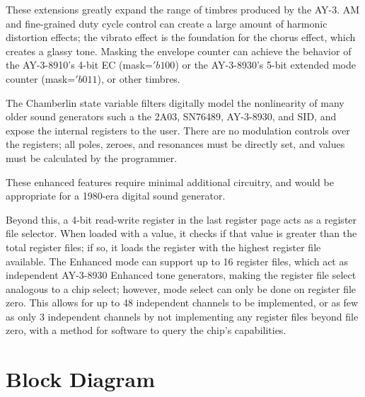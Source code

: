 These extensions greatly expand the range of timbres produced by the AY-3.  AM and fine-grained duty cycle control can create a large amount of harmonic distortion effects; the vibrato effect is the foundation for the chorus effect, which creates a glassy tone.  Masking the envelope counter can achieve the behavior of the AY-3-8910's 4-bit EC (mask=$'b100$) or the AY-3-8930's 5-bit extended mode counter (mask=$'b011$), or other timbres.

The Chamberlin state variable filters digitally model the nonlinearity of many older sound generators such a the 2A03, SN76489, AY-3-8930, and SID, and expose the internal registers to the user.  There are no modulation controls over the registers; all poles, zeroes, and resonances must be directly set, and values must be calculated by the programmer.

These enhanced features require minimal additional circuitry, and would be appropriate for a 1980-era digital sound generator.

Beyond this, a 4-bit read-write register in the last register page acts as a register file selector.  When loaded with a value, it checks if that value is greater than the total register files; if so, it loads the register with the highest register file available.  The Enhanced mode can support up to 16 register files, which act as independent AY-3-8930 Enhanced tone generators, making the register file select analogous to a chip select; however, mode select can only be done on register file zero.  This allows for up to 48 independent channels to be implemented, or as few as only 3 independent channels by not implementing any register files beyond file zero, with a method for software to query the chip's capabilities.

\section{Block Diagram}


